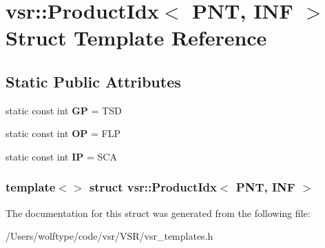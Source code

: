 \hypertarget{structvsr_1_1_product_idx_3_01_p_n_t_00_01_i_n_f_01_4}{\section{vsr\-:\-:Product\-Idx$<$ P\-N\-T, I\-N\-F $>$ Struct Template Reference}
\label{structvsr_1_1_product_idx_3_01_p_n_t_00_01_i_n_f_01_4}
}
\subsection*{Static Public Attributes}
\begin{DoxyCompactItemize}
\item 
\hypertarget{structvsr_1_1_product_idx_3_01_p_n_t_00_01_i_n_f_01_4_a5f31a4ea2be370359e70cef30ab3aa18}{static const int {\bfseries G\-P} = T\-S\-D}\label{structvsr_1_1_product_idx_3_01_p_n_t_00_01_i_n_f_01_4_a5f31a4ea2be370359e70cef30ab3aa18}

\item 
\hypertarget{structvsr_1_1_product_idx_3_01_p_n_t_00_01_i_n_f_01_4_ac09c9b7f930c1202628b81518eac998d}{static const int {\bfseries O\-P} = F\-L\-P}\label{structvsr_1_1_product_idx_3_01_p_n_t_00_01_i_n_f_01_4_ac09c9b7f930c1202628b81518eac998d}

\item 
\hypertarget{structvsr_1_1_product_idx_3_01_p_n_t_00_01_i_n_f_01_4_a1fa463e23946e47111349f4c6b538abe}{static const int {\bfseries I\-P} = S\-C\-A}\label{structvsr_1_1_product_idx_3_01_p_n_t_00_01_i_n_f_01_4_a1fa463e23946e47111349f4c6b538abe}

\end{DoxyCompactItemize}
\subsubsection*{template$<$$>$ struct vsr\-::\-Product\-Idx$<$ P\-N\-T, I\-N\-F $>$}



The documentation for this struct was generated from the following file\-:\begin{DoxyCompactItemize}
\item 
/\-Users/wolftype/code/vsr/\-V\-S\-R/vsr\-\_\-templates.\-h\end{DoxyCompactItemize}
